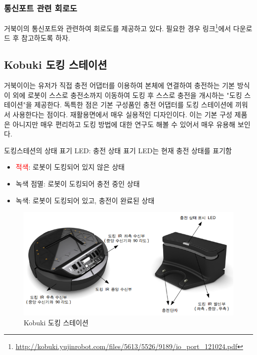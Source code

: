 \subsubsection{통신포트 관련 회로도}

거북이의 통신포트와 관련하여 회로도를 제공하고 있다. 필요한 경우 링크\footnote{\url{http://kobuki.yujinrobot.com/files/5613/5526/9189/io_port_121024.pdf}}에서 다운로드 후 참고하도록 하자. 

\subsection{Kobuki 도킹 스테이션}

거북이이는 유저가 직접 충전 어댑터를 이용하여 본체에 연결하여 충전하는 기본 방식 이 외에 로봇이 스스로 충전소까지 이동하여 도킹 후 스스로 충전을 개시하는 "도킹 스테이션"을 제공한다. 독특한 점은 기본 구성품인 충전 어댑터를 도킹 스테이션에 끼워서 사용한다는 점이다. 재활용면에서 매우 실용적인 디자인이다. 이는 기본 구성 제품은 아니지만 매우 편리하고 도킹 방법에 대한 연구도 해볼 수 있어서 매우 유용해 보인다.

\noindent
[참고사항] 
도킹스테션의 상태 표기 LED: 충전 상태 표기 LED는 현재 충전 상태를 표기함
\begin{itemize}[leftmargin=*]
\item\textcolor{red}{적색}: 로봇이 도킹되어 있지 않은 상태
\item{\color{limegreen}녹색 점멸}: 로봇이 도킹되어 충전 중인 상태
\item{\color{limegreen}녹색}: 로봇이 도킹되어 있고, 충전이 완료된 상태
\end{itemize}

\begin{figure}[h]
\centering\includegraphics[width=0.8\columnwidth]{pictures/chapter10/kobuki_docking_station.png}
\caption{Kobuki 도킹 스테이션}
\end{figure}

